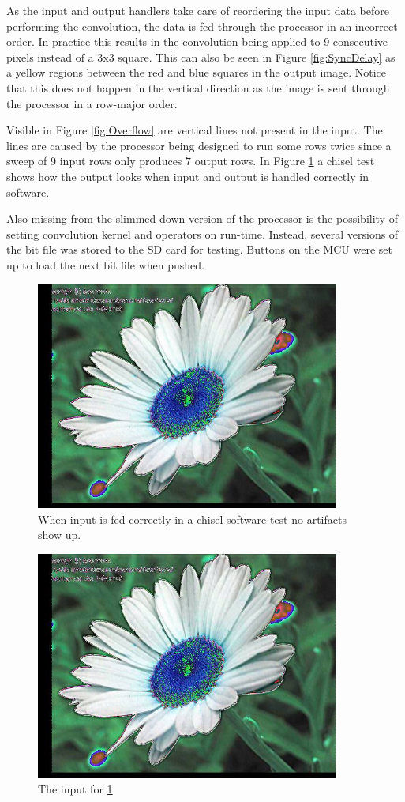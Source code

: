 As the input and output handlers take care of reordering the input data before performing the convolution, the data is fed through the processor in an incorrect order.
In practice this results in the convolution being applied to 9 consecutive pixels instead of a 3x3 square.
This can also be seen in Figure \ref{fig:SyncDelay} as a yellow regions between the red and blue squares in the output image.
Notice that this does not happen in the vertical direction as the image is sent through the processor in a row-major order.

Visible in Figure \ref{fig:Overflow} are vertical lines not present in the input.
The lines are caused by the processor being designed to run some rows twice since a sweep of 9 input rows only produces 7 output rows.
In Figure \ref{fig:soft_sim} a chisel test shows how the output looks when input and output is handled correctly in software.

Also missing from the slimmed down version of the processor is the possibility of setting convolution kernel and operators on run-time.
Instead, several versions of the bit file was stored to the SD card for testing.
Buttons on the MCU were set up to load the next bit file when pushed.

\begin{figure}
    \centering
    \includegraphics[width=10cm]{img/daisy1.jpg}
    \caption[Software simulated output]{When input is fed correctly in a chisel software test no artifacts show up.}
    \label{fig:soft_sim}
\end{figure}

\begin{figure}
    \centering
    \includegraphics[width=10cm]{img/daisy1.jpg}
    \caption[Software simulation input]{The input for \ref{fig:soft_sim}}
    \label{fig:soft_sim_input}
\end{figure}

